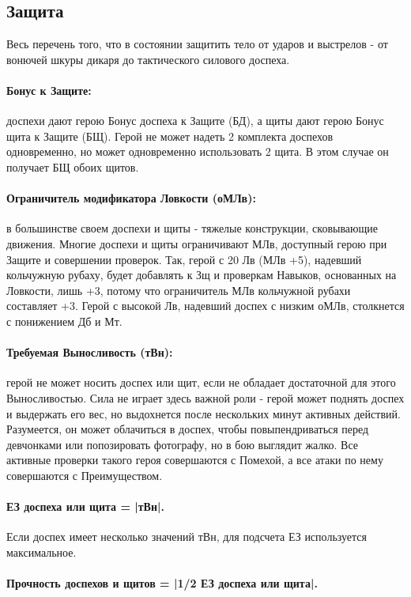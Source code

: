 \subsection{Защита}
Весь перечень того, что в состоянии защитить тело от ударов и выстрелов - от вонючей шкуры дикаря до тактического силового доспеха. 
\paragraph{Бонус к Защите:} доспехи дают герою Бонус доспеха к Защите (БД), а щиты дают герою Бонус щита к Защите (БЩ).
\newline Герой не может надеть 2 комплекта доспехов одновременно, но может одновременно использовать 2 щита. В этом случае он получает БЩ обоих щитов.
\paragraph{Ограничитель модификатора Ловкости (оМЛв):} в большинстве своем доспехи и щиты - тяжелые конструкции, сковывающие движения. Многие доспехи и щиты ограничивают МЛв, доступный герою при Защите и совершении проверок. Так, герой с 20 Лв (МЛв +5), надевший кольчужную рубаху, будет добавлять к Зщ и проверкам Навыков, основанных на Ловкости, лишь +3, потому что ограничитель МЛв кольчужной рубахи составляет +3. Герой с высокой Лв, надевший доспех с низким оМЛв, столкнется с понижением Дб и Мт.
\paragraph{Требуемая Выносливость (тВн):} герой не может носить доспех или щит, если не обладает достаточной для этого Выносливостью. Сила не играет здесь важной роли - герой может поднять доспех и выдержать его вес, но выдохнется после нескольких минут активных действий. Разумеется, он может облачиться в доспех, чтобы повыпендриваться перед девчонками или попозировать фотографу, но в бою выглядит жалко. Все активные проверки такого героя совершаются с Помехой, а все атаки по нему совершаются с Преимуществом.
\paragraph{ЕЗ доспеха или щита = |тВн|.} Если доспех имеет несколько значений тВн, для подсчета ЕЗ используется максимальное.	
\paragraph{Прочность доспехов и щитов = |1/2 ЕЗ доспеха или щита|.} 
